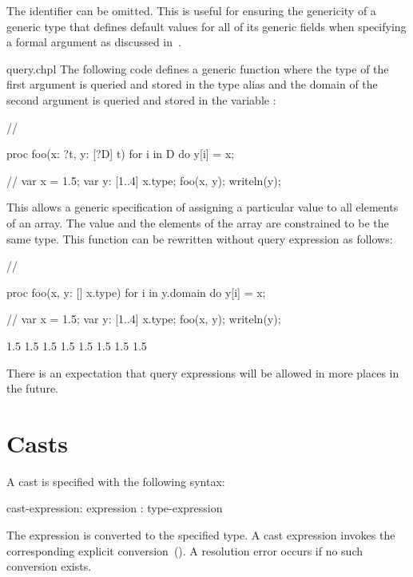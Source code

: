 The identifier can be omitted.  This is useful for ensuring the
genericity of a generic type that defines default values for all of
its generic fields when specifying a formal argument as discussed
in~.

\begin{chapelexample}{query.chpl}
The following code defines a generic function where the type of the
first argument is queried and stored in the type alias  and
the domain of the second argument is queried and stored in the
variable :
\begin{chapelnoprint}
{ // }
\end{chapelnoprint}
\begin{chapel}
proc foo(x: ?t, y: [?D] t) {
  for i in D do
    y[i] = x;
}
\end{chapel}
\begin{chapelnoprint}
// {
var x = 1.5;
var y: [1..4] x.type;
foo(x, y);
writeln(y);
}
\end{chapelnoprint}
This allows a generic specification of assigning a
particular value to all elements of an array.  The value and the
elements of the array are constrained to be the same type.  This
function can be rewritten without query expression as follows:
\begin{chapelnoprint}
{ // }
\end{chapelnoprint}
\begin{chapel}
proc foo(x, y: [] x.type) {
  for i in y.domain do
    y[i] = x;
}
\end{chapel}
\begin{chapelnoprint}
// {
var x = 1.5;
var y: [1..4] x.type;
foo(x, y);
writeln(y);
}
\end{chapelnoprint}
\begin{chapeloutput}
1.5 1.5 1.5 1.5
1.5 1.5 1.5 1.5
\end{chapeloutput}
\end{chapelexample}

There is an expectation that query expressions will be allowed in more
places in the future.

\section{Casts}
\label{Casts}

A cast is specified with the following syntax:
\begin{syntax}
cast-expression:
  expression : type-expression
\end{syntax}
The expression is converted to the specified type.  A cast expression invokes
the corresponding explicit conversion~().  A
resolution error occurs if no such conversion exists.

